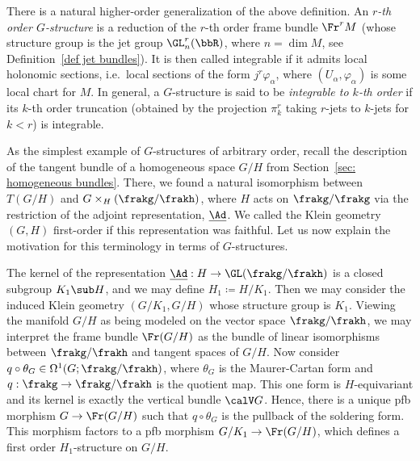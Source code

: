 \begin{rem}
    There is a natural higher-order generalization of the above definition. An \emph{$r$-th order $G$-structure} is a reduction of the $r$-th order frame bundle $\Fr^r M$ (whose structure group is the jet group $\GL^r_n(\bbR)$, where $n=\dim M$, see Definition~\ref{def jet bundles}). It is then called integrable if it admits local holonomic sections, i.e.\ local sections of the form $j^r \varphi_\alpha$, where $(U_\alpha,\varphi_\alpha)$ is some local chart for $M$. In general, a $G$-structure is said to be \emph{integrable to $k$-th order} if its $k$-th order truncation (obtained by the projection $\pi^r_k$ taking $r$-jets to $k$-jets for $k<r$) is integrable.
\end{rem}

\begin{rem}\label{rem higher order Klein geometry}
    As the simplest example of $G$-structures of arbitrary order, recall the description of the tangent bundle of a homogeneous space $G\slash H$ from Section~\ref{sec: homogeneous bundles}. There, we found a natural isomorphism between $T(G\slash H)$ and $G\times_H (\frakg\slash\frakh)$, where $H$ acts on $\frakg\slash\frakg$ via the restriction of the adjoint representation,  $\underline{\Ad}$. We called the Klein geometry $(G,H)$ first-order if this representation was faithful. Let us now explain the motivation for this terminology in terms of $G$-structures.

    The kernel of the representation $\underline{\Ad}:H\to \GL(\frakg\slash\frakh)$ is a closed subgroup $K_1\sub H$, and we may define $H_1\coloneqq H\slash K_1$. Then we may consider the induced Klein geometry $(G\slash K_1,G\slash H)$ whose structure group is $K_1$. Viewing the manifold $G\slash H$ as being modeled on the vector space $\frakg\slash\frakh$, we may interpret the frame bundle $\Fr (G\slash H)$ as the bundle of linear isomorphisms between $\frakg\slash\frakh$ and tangent spaces of $G\slash H$. Now consider $q\circ \theta_G\in \Omega^1(G;\frakg\slash\frakh)$, where $\theta_G$ is the Maurer-Cartan form and $q:\frakg\to\frakg\slash\frakh$ is the quotient map. This one form is $H$-equivariant and its kernel is exactly the vertical bundle $\calV G$. Hence, there is a unique \gls{pfb} morphism $G\to \Fr(G\slash H)$ such that $q\circ \theta_G$ is the pullback of the soldering form. This morphism factors to a \gls{pfb} morphism $G\slash K_1\to \Fr(G\slash H)$, which defines a first order $H_1$-structure on $G\slash H$.


\end{rem}
